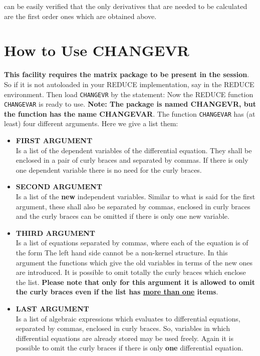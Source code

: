 can be easily verified that the only derivatives that are needed to be
calculated are the first order ones which are obtained above.

\section{How to Use CHANGEVR}
{\bf This facility requires the matrix package to be present in the session}.
So if it is not autoloaded in your REDUCE implementation, say
in the REDUCE environment. Then load {\tt CHANGEVR} by the statement:
Now the REDUCE function {\tt CHANGEVAR} is ready to use. {\bf Note:  The
package is named CHANGEVR, but the function has the name CHANGEVAR}.  The
function {\tt CHANGEVAR} has (at least) four different arguments.  Here we
give a list them:
\begin{itemize}
\item {\bf FIRST ARGUMENT} \\
     Is a list of the dependent variables of the differential equation.
     They shall be enclosed in a pair of curly braces and separated by commas.
     If there is only one dependent variable there is no need for the curly
     braces.
\item {\bf SECOND ARGUMENT}  \\
     Is a list of the {\bf new} independent variables. Similar to what is said
     for the first argument, these shall also be separated by commas,
     enclosed in curly braces and the curly braces can be omitted if there is
     only one new variable.
\item {\bf THIRD ARGUMENT}  \\
     Is a list of equations separated by commas, where each of the equation
     is of the form
     The left hand side cannot be a non-kernel structure. In this argument
     the functions which give the old variables in terms of the new ones are
     introduced. It is possible to omit totally the curly braces which enclose
     the list. {\bf Please note that only for this argument it is allowed to
     omit the curly braces even if the list has \underline{more than one}
     items}.
\item {\bf LAST ARGUMENT}  \\
     Is a list of algebraic expressions which evaluates to  differential
     equations, separated by commas, enclosed in curly braces.
     So, variables in which differential equations are already stored may be
     used freely. Again it is possible to omit the curly braces if there is
     only {\bf one} differential equation.
\end{itemize}

